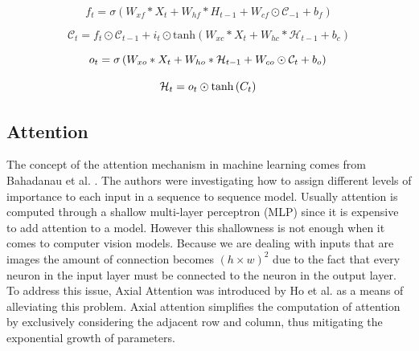 \begin{equation}
  f_{t} = \sigma\left(W_{xf} * X_{t} + W_{hf} * H_{t-1} + W_{cf} \odot \mathcal{C}_{-1} + b_{f}\right)
\end{equation}

\begin{equation}
  \mathcal{C}_{t} = f_{t} \odot \mathcal{C}_{t-1} + i_{t} \odot \text{tanh}\left(W_{xc} * X_{t} + W_{hc} * \mathcal{H}_{t-1} + b_{c}\right)
\end{equation}

\begin{equation}
  o_{t} = \sigma\left(W_{xo} * X_{t} + W_{ho} * \mathcal{H}_{t-1} + W_{co} \odot \mathcal{C}_{t} + b_{o}\right)\\
\end{equation}

\begin{equation}
  \mathcal{H}_{t} = o_{t} \odot \text{tanh}\left(C_{t}\right)\\
\end{equation}

\subsection{Attention}
The concept of the attention mechanism in machine learning comes from Bahadanau et al. \cite{bahdanau-2015}. The authors were investigating how to assign different levels of importance to each input in a sequence to sequence model.
Usually attention is computed through a shallow multi-layer perceptron (MLP) since it is expensive to add attention to a model.
However this shallowness is not enough when it comes to computer vision models. Because we are dealing with inputs that are images the amount of connection becomes $(h\times w)^2$
due to the fact that every neuron in the input layer must be connected to the neuron in the output layer.
To address this issue, Axial Attention was introduced by Ho et al. \cite{DBLP:journals/corr/abs-1912-12180} as a means of alleviating this problem.
Axial attention simplifies the computation of attention by exclusively considering the adjacent row and column, thus mitigating the exponential growth of parameters.

